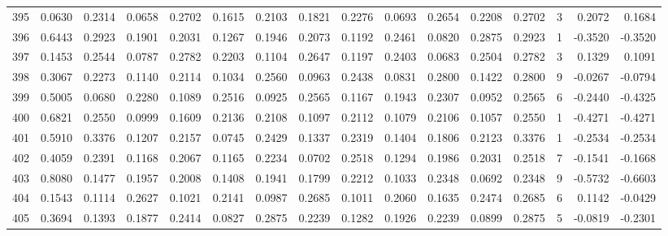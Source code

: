 \begin{tabular}{lrrrrrrrrrrrrrrr}
395 &      0.0630 &  0.2314 &  0.0658 &  0.2702 &  0.1615 &  0.2103 &  0.1821 &  0.2276 &  0.0693 &  0.2654 &   0.2208 &     0.2702 &      3 &                    0.2072 &                     0.1684 \\
396 &      0.6443 &  0.2923 &  0.1901 &  0.2031 &  0.1267 &  0.1946 &  0.2073 &  0.1192 &  0.2461 &  0.0820 &   0.2875 &     0.2923 &      1 &                   -0.3520 &                    -0.3520 \\
397 &      0.1453 &  0.2544 &  0.0787 &  0.2782 &  0.2203 &  0.1104 &  0.2647 &  0.1197 &  0.2403 &  0.0683 &   0.2504 &     0.2782 &      3 &                    0.1329 &                     0.1091 \\
398 &      0.3067 &  0.2273 &  0.1140 &  0.2114 &  0.1034 &  0.2560 &  0.0963 &  0.2438 &  0.0831 &  0.2800 &   0.1422 &     0.2800 &      9 &                   -0.0267 &                    -0.0794 \\
399 &      0.5005 &  0.0680 &  0.2280 &  0.1089 &  0.2516 &  0.0925 &  0.2565 &  0.1167 &  0.1943 &  0.2307 &   0.0952 &     0.2565 &      6 &                   -0.2440 &                    -0.4325 \\
400 &      0.6821 &  0.2550 &  0.0999 &  0.1609 &  0.2136 &  0.2108 &  0.1097 &  0.2112 &  0.1079 &  0.2106 &   0.1057 &     0.2550 &      1 &                   -0.4271 &                    -0.4271 \\
401 &      0.5910 &  0.3376 &  0.1207 &  0.2157 &  0.0745 &  0.2429 &  0.1337 &  0.2319 &  0.1404 &  0.1806 &   0.2123 &     0.3376 &      1 &                   -0.2534 &                    -0.2534 \\
402 &      0.4059 &  0.2391 &  0.1168 &  0.2067 &  0.1165 &  0.2234 &  0.0702 &  0.2518 &  0.1294 &  0.1986 &   0.2031 &     0.2518 &      7 &                   -0.1541 &                    -0.1668 \\
403 &      0.8080 &  0.1477 &  0.1957 &  0.2008 &  0.1408 &  0.1941 &  0.1799 &  0.2212 &  0.1033 &  0.2348 &   0.0692 &     0.2348 &      9 &                   -0.5732 &                    -0.6603 \\
404 &      0.1543 &  0.1114 &  0.2627 &  0.1021 &  0.2141 &  0.0987 &  0.2685 &  0.1011 &  0.2060 &  0.1635 &   0.2474 &     0.2685 &      6 &                    0.1142 &                    -0.0429 \\
405 &      0.3694 &  0.1393 &  0.1877 &  0.2414 &  0.0827 &  0.2875 &  0.2239 &  0.1282 &  0.1926 &  0.2239 &   0.0899 &     0.2875 &      5 &                   -0.0819 &                    -0.2301 \\

\end{tabular}
